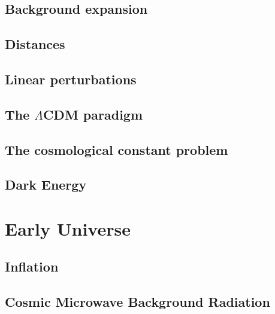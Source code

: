 \subsection{Background expansion}

\subsection{Distances}

\subsection{Linear perturbations}

\subsection{The $\Lambda$CDM paradigm}

\subsection{The cosmological constant problem}

\subsection{Dark Energy}



\section{Early Universe}

\subsection{Inflation}

\subsection{Cosmic Microwave Background Radiation}



